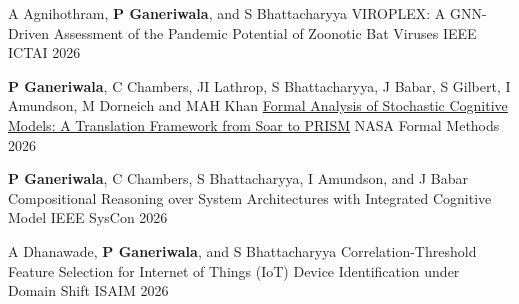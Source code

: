 \begin{cventries}
{ %
\begin{cvitems}
\end{cvitems}
}
\cventry
{A Agnihothram, \textbf{P Ganeriwala}, and S Bhattacharyya}
{VIROPLEX: A GNN-Driven Assessment of the Pandemic Potential of Zoonotic Bat Viruses}
{}
{IEEE ICTAI 2026}
{ %
\begin{cvitems}
\end{cvitems}
}
\cventry
{\textbf{P Ganeriwala}, C Chambers, JI Lathrop, S Bhattacharyya, J Babar, S Gilbert, I Amundson, M Dorneich and MAH Khan}
{\href{https://link.springer.com/chapter/10.1007/978-3-032-28079-4_9}{Formal Analysis of Stochastic Cognitive Models: A Translation Framework from Soar to PRISM}}
{}
{NASA Formal Methods 2026} 
{ %
\begin{cvitems}
\end{cvitems}
}
\cventry
{\textbf{P Ganeriwala}, C Chambers, S Bhattacharyya, I Amundson, and J Babar}
{Compositional Reasoning over System Architectures with Integrated Cognitive Model}
{}
{IEEE SysCon 2026} 
{ %
\begin{cvitems}
\end{cvitems}
}
\cventry
{A Dhanawade, \textbf{P Ganeriwala}, and S Bhattacharyya}
{Correlation-Threshold Feature Selection for Internet of Things (IoT) Device Identification under Domain Shift}
{}
{ISAIM 2026} 
{ %
\begin{cvitems}
\end{cvitems}
}
\end{cventries}
